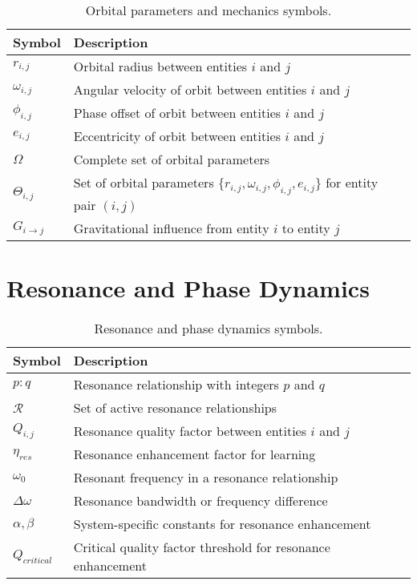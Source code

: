 \begin{table}[h]
\centering
\begin{tabular}{|l|p{10cm}|}
\hline
\textbf{Symbol} & \textbf{Description} \\
\hline
$r_{i,j}$ & Orbital radius between entities $i$ and $j$ \\
\hline
$\omega_{i,j}$ & Angular velocity of orbit between entities $i$ and $j$ \\
\hline
$\phi_{i,j}$ & Phase offset of orbit between entities $i$ and $j$ \\
\hline
$e_{i,j}$ & Eccentricity of orbit between entities $i$ and $j$ \\
\hline
$\Omega$ & Complete set of orbital parameters \\
\hline
$\Theta_{i,j}$ & Set of orbital parameters $\{r_{i,j}, \omega_{i,j}, \phi_{i,j}, e_{i,j}\}$ for entity pair $(i,j)$ \\
\hline
$G_{i \rightarrow j}$ & Gravitational influence from entity $i$ to entity $j$ \\
\hline
\end{tabular}
\caption{Orbital parameters and mechanics symbols.}
\label{tab:symbols_orbital}
\end{table}

\section{Resonance and Phase Dynamics}

\begin{table}[h]
\centering
\begin{tabular}{|l|p{10cm}|}
\hline
\textbf{Symbol} & \textbf{Description} \\
\hline
$p:q$ & Resonance relationship with integers $p$ and $q$ \\
\hline
$\mathcal{R}$ & Set of active resonance relationships \\
\hline
$Q_{i,j}$ & Resonance quality factor between entities $i$ and $j$ \\
\hline
$\eta_{res}$ & Resonance enhancement factor for learning \\
\hline
$\omega_0$ & Resonant frequency in a resonance relationship \\
\hline
$\Delta \omega$ & Resonance bandwidth or frequency difference \\
\hline
$\alpha, \beta$ & System-specific constants for resonance enhancement \\
\hline
$Q_{critical}$ & Critical quality factor threshold for resonance enhancement \\
\hline
\end{tabular}
\caption{Resonance and phase dynamics symbols.}
\label{tab:symbols_resonance}
\end{table}

